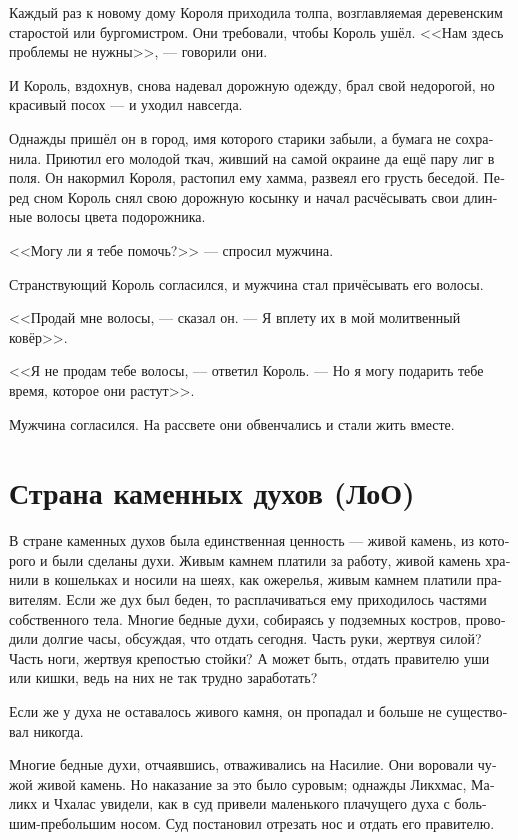 \documentclass[a4paper,12pt,fleqn]{book}\usepackage{polyglossia}\setdefaultlanguage[babelshorthands=true]{russian}\setotherlanguage{english}\defaultfontfeatures{Ligatures=TeX,Mapping=tex-text}\usepackage{xcolor}\newcommand{\ml}[3]{#2}
\begin{document}
{Каждый раз к новому дому Короля приходила толпа, возглавляемая деревенским старостой или бургомистром.
Они требовали, чтобы Король ушёл.
<<Нам здесь проблемы не нужны>>, --- говорили они.

И Король, вздохнув, снова надевал дорожную одежду, брал свой недорогой, но красивый посох --- и уходил навсегда.

Однажды пришёл он в город, имя которого старики забыли, а бумага не сохранила.
Приютил его молодой ткач, живший на самой окраине да ещё пару лиг в поля.
Он накормил Короля, растопил ему хамма, развеял его грусть беседой.
Перед сном Король снял свою дорожную косынку и начал расчёсывать свои длинные волосы цвета подорожника.

<<Могу ли я тебе помочь?>> --- спросил мужчина.

Странствующий Король согласился, и мужчина стал причёсывать его волосы.

<<Продай мне волосы, --- сказал он.
--- Я вплету их в мой молитвенный ковёр>>.

<<Я не продам тебе волосы, --- ответил Король.
--- Но я могу подарить тебе время, которое они растут>>.

Мужчина согласился.
На рассвете они обвенчались и стали жить вместе.

\section{Страна каменных духов (ЛоО)}

В стране каменных духов была единственная ценность --- живой камень, из которого и были сделаны духи.
Живым камнем платили за работу, живой камень хранили в кошельках и носили на шеях, как ожерелья, живым камнем платили правителям.
Если же дух был беден, то расплачиваться ему приходилось частями собственного тела.
Многие бедные духи, собираясь у подземных костров, проводили долгие часы, обсуждая, что отдать сегодня.
Часть руки, жертвуя силой?
Часть ноги, жертвуя крепостью стойки?
А может быть, отдать правителю уши или кишки, ведь на них не так трудно заработать?

Если же у духа не оставалось живого камня, он пропадал и больше не существовал никогда.

Многие бедные духи, отчаявшись, отваживались на Насилие.
Они воровали чужой живой камень.
Но наказание за это было суровым;
однажды Ликхмас, Маликх и Чхалас увидели, как в суд привели маленького плачущего духа с большим-пребольшим носом.
Суд постановил отрезать нос и отдать его правителю.

}
\end{document}
